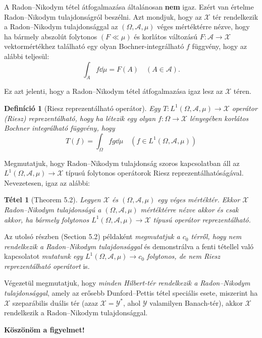 \documentclass{beamer} %
\newtheorem{theo}[lem]{Tétel}
\newtheorem{defi}[lem]{Definíció}
\begin{document}
\begin{frame}
\justifying
A Radon\---Nikodym tétel átfogalmazása általánosan \textbf{nem} igaz. \pause Ezért van értelme Radon\---Nikodym tulajdonságról beszélni. \pause Azt mondjuk, hogy az $\mathcal{X}$ tér rendelkezik a Radon\---Nikodym tulajdonsággal az $(\Omega,\mathcal{A},\mu)$ véges mértéktérre nézve, hogy ha bármely abszolút folytonos $(F \ll \mu)$ és korlátos változású $F\colon \mathcal{A} \to \mathcal{X}$ vektormértékhez található egy olyan Bochner-integrálható $f$ függvény, hogy az alábbi teljesül:
$$\int_{A} f \dd{\mu} = F(A) \quad (A \in \mathcal{A}).$$

\pause Ez azt jelenti, hogy a Radon\---Nikodym tétel átfogalmazása igaz lesz az $\mathcal{X}$ téren.
\pause \begin{defi}[Riesz reprezentálható operátor] Egy $T \colon L^1(\Omega, \mathcal{A}, \mu) \to \mathcal{X}$ operátor (Riesz) reprezentálható, hogy ha létezik egy olyan $f\colon \Omega \to \mathcal{X}$ lényegében korlátos Bochner integrálható függvény, hogy
$$T(f) = \int_{\Omega} fg \dd{\mu} \quad(f \in L^1(\Omega, \mathcal{A}, \mu))$$
\end{defi}
\end{frame}
\begin{frame}
\justifying
Megmutatjuk, hogy Radon\---Nikodym tulajdonság szoros kapcsolatban áll az $L^1(\Omega, \mathcal{A}, \mu) \to \mathcal{X}$ típusú folytonos operátorok Riesz reprezentálhatóságával. \pause Nevezetesen, igaz az alábbi:
\begin{theo}[Theorem 5.2] Legyen $\mathcal{X}$ és $(\Omega, \mathcal{A}, \mu)$ egy véges mértéktér. Ekkor $\mathcal{X}$ Radon\---Nikodym tulajdonságú a $(\Omega, \mathcal{A}, \mu)$ mértéktérre nézve akkor és csak akkor, ha bármely folytonos $L^1(\Omega, \mathcal{A}, \mu) \to \mathcal{X}$ típusú operátor reprezentálható.
\end{theo}
\pause Az utolsó részben (Section 5.2) példaként \textit{megmutatjuk a $c_0$ térről, hogy nem rendelkezik a Radon\---Nikodym tulajdonsággal} \pause és demonstrálva a fenti tétellel való kapcsolatot \textit{mutatunk egy $L^1(\Omega, \mathcal{A}, \mu) \to c_0$ folytonos, de nem Riesz reprezentálható operátort} is.

\pause Végezetül megmutatjuk, hogy \textit{minden Hilbert-tér rendelkezik a Radon\---Nikodym tulajdonsággal}, \pause amely az erősebb Dunford\---Pettis tétel speciális esete, miszerint ha $\mathcal{X}$ szeparábilis duális tér (azaz $\mathcal{X} = \mathcal{Y}^*$, ahol $\mathcal{Y}$ valamilyen Banach-tér), akkor $\mathcal{X}$ rendelkezik a Radon\---Nikodym tulajdonsággal.
\end{frame}
\begin{frame}
\center
\textbf{Köszönöm a figyelmet!}
\end{frame}
\end{document}
